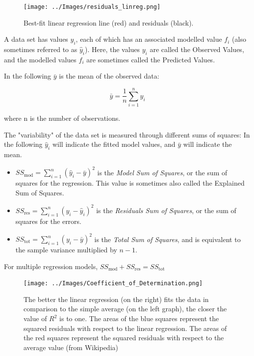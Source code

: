 \begin{figure}
  \centering
  \texttt{[image: ../Images/residuals\_linreg.png]}\\
  \caption{Best-fit linear regression line (red) and residuals (black). }\label{fig:residuals}
\end{figure}

A data set has values $y_i$, each of which has an associated modelled value $f_i$ (also sometimes referred to as $\hat{y}_i$). Here, the values $y_i$ are called the Observed Values, and the modelled values $f_i$ are sometimes called the Predicted Values.

In the following $\bar{y}$ is the mean of the observed data:

\begin{equation}
  \bar{y}=\frac{1}{n}\sum_{i=1}^n y_i
\end{equation}

where n is the number of observations.

The "variability" of the data set is measured through different sums of squares:
In the following $\hat{y}_i$ will indicate the fitted model values, and $\bar{y}$ will indicate the mean.

\begin{itemize}
  \item $SS_\text{mod} = \sum_{i=1}^n (\hat{y}_i-\bar{y})^2$ is the \emph{Model Sum of Squares}, or the sum of squares for the regression. This value is sometimes also called the Explained Sum of Squares.
  \item $SS_\text{res} = \sum_{i=1}^n (y_i-\hat{y}_i)^2$ is the \emph{Residuals Sum of Squares}, or the sum of squares for the errors.
  \item $SS_\text{tot} = \sum_{i=1}^n (y_i-\bar{y})^2$ is the \emph{Total Sum of Squares}, and is equivalent to the sample variance multiplied by $n-1$.
\end{itemize}

For multiple regression models, $SS_\text{mod} + SS_\text{res} = SS_\text{tot}$

\begin{figure}
  \centering
  \texttt{[image: ../Images/Coefficient\_of\_Determination.png]}\\
  \caption{The better the linear regression (on the right) fits the data in comparison to the simple average (on the left graph), the closer the value of $R^2$ is to one. The areas of the blue squares represent the squared residuals with respect to the linear regression. The areas of the red squares represent the squared residuals with respect to the average value (from Wikipedia)}\label{fig:CoefDetermination}
\end{figure}


